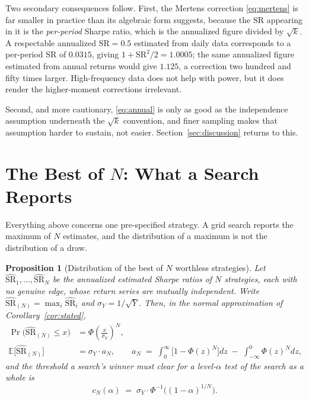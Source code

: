 \documentclass[11pt]{article}
\newtheorem{proposition}{Proposition}
\theoremstyle{remark}
\theoremstyle{definition}
\newcommand{\SR}{\text{SR}}
\newcommand{\SRhat}{\widehat{\text{SR}}}
\begin{document}
Two secondary consequences follow. First, the Mertens correction \eqref{eq:mertens} is far smaller in practice than its algebraic form suggests, because the $\SR$ appearing in it is the \emph{per-period} Sharpe ratio, which is the annualized figure divided by $\sqrt{k}$. A respectable annualized $\SR = 0.5$ estimated from daily data corresponds to a per-period $\SR$ of $0.0315$, giving $1 + \SR^2/2 = 1.0005$; the same annualized figure estimated from annual returns would give $1.125$, a correction two hundred and fifty times larger. High-frequency data does not help with power, but it does render the higher-moment corrections irrelevant.

Second, and more cautionary, \eqref{eq:annual} is only as good as the independence assumption underneath the $\sqrt{k}$ convention, and finer sampling makes that assumption harder to sustain, not easier. Section~\ref{sec:discussion} returns to this.

\section{The Best of \texorpdfstring{$N$}{N}: What a Search Reports}
\label{sec:maxN}

Everything above concerns one pre-specified strategy. A grid search reports the maximum of $N$ estimates, and the distribution of a maximum is not the distribution of a draw.

\begin{proposition}[Distribution of the best of $N$ worthless strategies]
\label{prop:maxN}
Let $\SRhat_1,\dots,\SRhat_N$ be the annualized estimated Sharpe ratios of $N$ strategies, each with no genuine edge, whose return series are mutually independent. Write $\SRhat_{(N)} = \max_i \SRhat_i$ and $\sigma_Y = 1/\sqrt{Y}$. Then, in the normal approximation of Corollary~\ref{cor:stated},
\begin{align}
\Pr\big(\SRhat_{(N)} \le x\big) &= \Phi\!\left(\frac{x}{\sigma_Y}\right)^{\!N},
\label{eq:maxcdf}\\
\mathbb{E}\big[\SRhat_{(N)}\big] &= \sigma_Y \cdot a_N, \qquad a_N \;=\; \int_0^\infty \!\Big[1-\Phi(z)^N\Big]dz \;-\; \int_{-\infty}^0 \!\Phi(z)^N dz,
\label{eq:maxmean}
\end{align}
and the threshold a search's winner must clear for a level-$\alpha$ test \emph{of the search as a whole} is
\begin{equation}
\label{eq:hurdle}
c_N(\alpha) \;=\; \sigma_Y \cdot \Phi^{-1}\!\big((1-\alpha)^{1/N}\big).
\end{equation}
\end{proposition}
\end{document}
